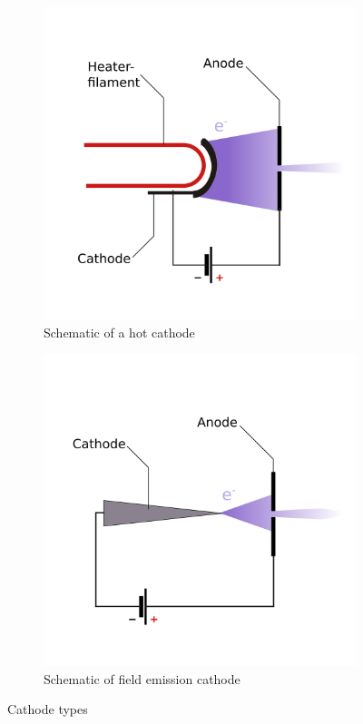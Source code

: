 \begin{figure}
	\centering
	\begin{subfigure}{.5\textwidth}
		\centering
		\includegraphics[height=0.3\textheight]{Chapters/CRT-Basics/HotCathode}
		\caption{Schematic of a hot cathode}
		\label{fig:hotcathode}
	\end{subfigure}%
	\begin{subfigure}{.5\textwidth}
		\centering
		\includegraphics[height=0.3\textheight]{Chapters/CRT-Basics/ColdCathode}
		\caption{Schematic of field emission cathode}
		\label{fig:coldcathode}
	\end{subfigure}
	\caption{Cathode types}
	\label{fig:cathodes}
\end{figure}

